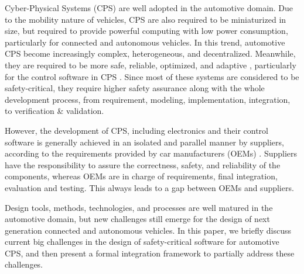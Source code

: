 
\graphicspath{{./figs/}{./figs/item-toyota/}}


Cyber-Physical Systems (CPS) are well adopted in the automotive domain. Due to the mobility nature of vehicles, CPS are also required to be miniaturized in size, but required to provide powerful computing with low power consumption, particularly for connected and autonomous vehicles. In this trend, automotive CPS become increasingly complex, heterogeneous, and decentralized. Meanwhile, they are required to be more safe, reliable, optimized, and adaptive \cite{darpa-avm}, particularly for the control software in CPS \cite{broy06}. Since most of these systems are considered to be safety-critical, they require higher safety assurance along with the whole development process, from requirement, modeling, implementation, integration, to verification \& validation. 


However, the development of CPS, including electronics and their control software is generally achieved in an isolated and parallel manner by suppliers, according to the requirements provided by car manufacturers (OEMs) \cite{broy06}. Suppliers have the responsibility to assure the correctness, safety, and reliability of the components, whereas OEMs are in charge of requirements, final integration, evaluation and testing. This always leads to a gap between OEMs and suppliers. 

Design tools, methods, technologies, and processes are well matured in the automotive domain, but new challenges still emerge for the design of next generation connected and autonomous vehicles. In this paper, we briefly discuss current big challenges in the design of safety-critical software for automotive CPS, and then present a formal integration framework to partially address these challenges.







